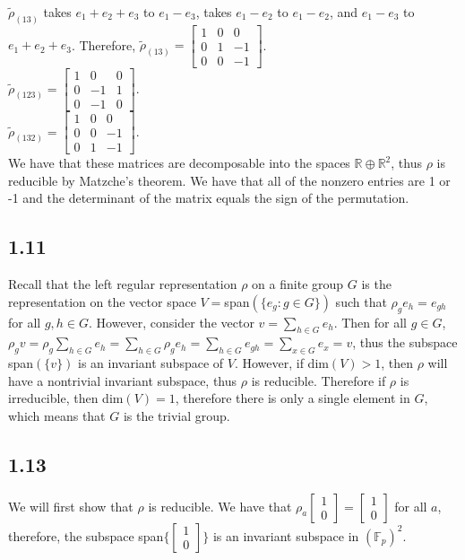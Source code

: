 \documentclass[]{article}
\begin{document}
$\tilde{\rho}_{(13)}$ takes $e_1 + e_2 + e_3$ to $e_1 - e_3$, takes $e_1 - e_2$ to $e_1 - e_2$, and $e_1 - e_3$ to $e_1 + e_2 + e_3$. Therefore, 
$\tilde{\rho}_{(13)} = 
\begin{bmatrix}
	1 & 0 & 0\\
	0 & 1 & -1\\
	0 & 0 & -1
\end{bmatrix}
$.
\\
$\tilde{\rho}_{(123)} = 
\begin{bmatrix}
	1 & 0 & 0\\
	0 & -1 & 1\\
	0 & -1 & 0
\end{bmatrix}
$.
\\
$\tilde{\rho}_{(132)} = 
\begin{bmatrix}
	1 & 0 & 0\\
	0 & 0 & -1\\
	0 & 1 & -1
\end{bmatrix}
$.
\\
We have that these matrices are decomposable into the spaces $\mathbb{R} \oplus \mathbb{R}^2$, thus $\rho$ is reducible by Matzche's theorem. We have that all of the nonzero entries are 1 or -1 and the determinant of the matrix equals the sign of the permutation.

\subsection*{1.11}
Recall that the left regular representation $\rho$ on a finite group $G$ is the representation on the vector space $V=$span$(\lbrace e_g : g \in G \rbrace)$ such that $\rho_g e_h = e_{gh}$ for all $g, h \in G$. However, consider the vector $v = \sum_{h \in G} e_h$. Then for all $g \in G$, $\rho_g v = \rho_g \sum_{h \in G} e_h = \sum_{h \in G} \rho_g e_h = \sum_{h \in G} e_{gh} = \sum_{x \in G} e_x = v$, thus the subspace span$(\lbrace v \rbrace)$ is an invariant subspace of $V$. However, if dim$(V) > 1$, then $\rho$ will have a nontrivial invariant subspace, thus $\rho$ is reducible. Therefore if $\rho$ is irreducible, then dim$(V) = 1$, therefore there is only a single element in $G$, which means that $G$ is the trivial group.
\subsection*{1.13}
We will first show that $\rho$ is reducible. We have that $\rho_a \begin{bmatrix}
	1\\
	0
\end{bmatrix}
= \begin{bmatrix}
	1\\
	0
\end{bmatrix}
$ for all $a$, therefore, the subspace span$\lbrace \begin{bmatrix}
	1\\
	0
\end{bmatrix} \rbrace$ is an invariant subspace in $(\mathbb{F}_p)^2$. 
\end{document}
